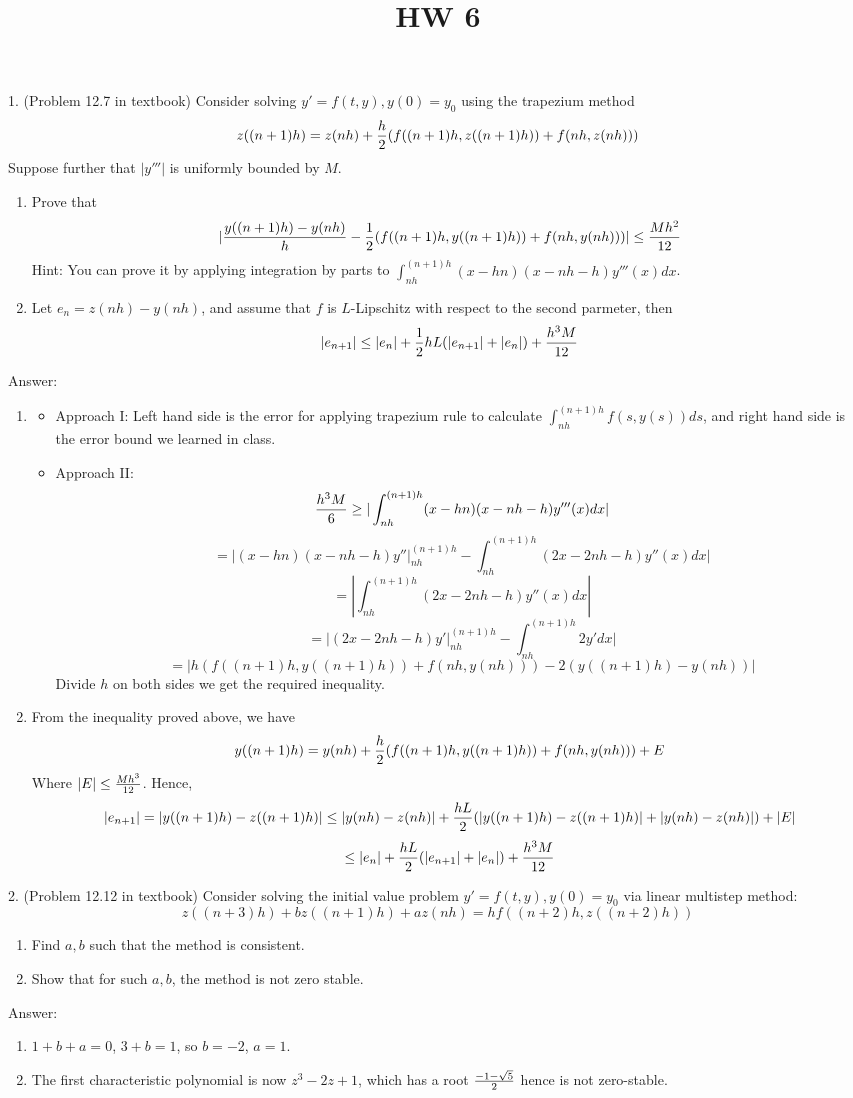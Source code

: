 \documentclass[20pt]{article} %
\title{HW 6}
\theoremstyle{break}
\begin{document}
\maketitle

1. (Problem 12.7 in textbook) Consider solving $y'=f(t, y), y(0)=y_0$ using the trapezium method
\[z((n+1)h)=z(nh)+{h\over 2}(f((n+1)h, z((n+1)h))+f(nh, z(nh)))\]
Suppose further that $|y'''|$ is uniformly bounded by $M$.
\begin{enumerate}
\item Prove that
  \[|{y((n+1)h)-y(nh)\over h}-{1\over 2}(f((n+1)h, y((n+1)h))+f(nh, y(nh)))|\leq {Mh^2\over 12}\]
  Hint: You can prove it by applying integration by parts to $\int_{nh}^{(n+1)h}(x-hn)(x-nh-h)y'''(x)dx$. 
\item Let $e_n=z(nh)-y(nh)$, and assume that $f$ is $L$-Lipschitz with respect to the second parmeter, then
  \[|e_{n+1}|\leq |e_n|+{1\over 2}hL(|e_{n+1}|+|e_n|)+{h^3M\over 12}\]
\end{enumerate}

Answer:

\begin{enumerate}
\item\begin{itemize}
  \item Approach I: Left hand side is the error for applying trapezium rule to calculate $\int_{nh}^{(n+1)h}f(s, y(s))ds$, and right hand side is the error bound we learned in class.
  \item Approach II:
    \[{h^3M\over 6}\geq |\int_{nh}^{(n+1)h}(x-hn)(x-nh-h)y'''(x)dx|\]
    \[=|(x-hn)(x-nh-h)y''|_{nh}^{(n+1)h}-\int_{nh}^{(n+1)h}(2x-2nh-h)y''(x)dx|\]
    \[=|\int_{nh}^{(n+1)h}(2x-2nh-h)y''(x)dx|\]
    \[=|(2x-2nh-h)y'|_{nh}^{(n+1)h}-\int_{nh}^{(n+1)h}2y'dx|\]
    \[=|h(f((n+1)h, y((n+1)h))+f(nh, y(nh)))-2(y((n+1)h)-y(nh))|\]
    Divide $h$ on both sides we get the required inequality.
    
   \end{itemize}
 \item From the inequality proved above, we have
   \[y((n+1)h)=y(nh)+{h\over 2}(f((n+1)h, y((n+1)h))+f(nh, y(nh)))+E\]
   Where $|E|\leq {Mh^3\over 12}$. Hence,
   \[|e_{n+1}|=|y((n+1)h)-z((n+1)h)|\leq |y(nh)-z(nh)|+{hL\over 2}(|y((n+1)h)-z((n+1)h)|+|y(nh)-z(nh)|)+|E|\]
   \[\leq |e_n|+{hL\over 2}(|e_{n+1}|+|e_n|)+{h^3M\over 12}\]
\end{enumerate}

2. (Problem 12.12 in textbook) Consider solving the initial value problem $y'=f(t, y), y(0)=y_0$ via linear multistep method:
\[z((n+3)h)+bz((n+1)h)+az(nh)=hf((n+2)h, z((n+2)h))\]
\begin{enumerate}
\item Find $a, b$ such that the method is consistent.
\item Show that for such $a, b$, the method is not zero stable.
\end{enumerate}

Answer:
\begin{enumerate}
\item $1+b+a=0$, $3+b=1$, so $b=-2$, $a=1$.
\item The first characteristic polynomial is now $z^3-2z+1$, which has a root ${-1-\sqrt{5}\over 2}$ hence is not zero-stable.
\end{enumerate}
\end{document}
